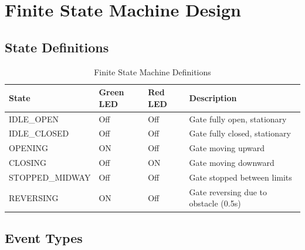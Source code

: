 \documentclass[11pt,a4paper]{article}
\begin{document}
\section{Finite State Machine Design}

\subsection{State Definitions}

\begin{table}[H]
\centering
\small
\begin{tabularx}{\textwidth}{lllX}
\toprule
\textbf{State} & \textbf{Green LED} & \textbf{Red LED} & \textbf{Description} \\
\midrule
IDLE\_OPEN & Off & Off & Gate fully open, stationary \\
IDLE\_CLOSED & Off & Off & Gate fully closed, stationary \\
OPENING & ON & Off & Gate moving upward \\
CLOSING & Off & ON & Gate moving downward \\
STOPPED\_MIDWAY & Off & Off & Gate stopped between limits \\
REVERSING & ON & Off & Gate reversing due to obstacle (0.5s) \\
\bottomrule
\end{tabularx}
\caption{Finite State Machine Definitions}
\label{tab:states}
\end{table}

\subsection{Event Types}
\end{document}
